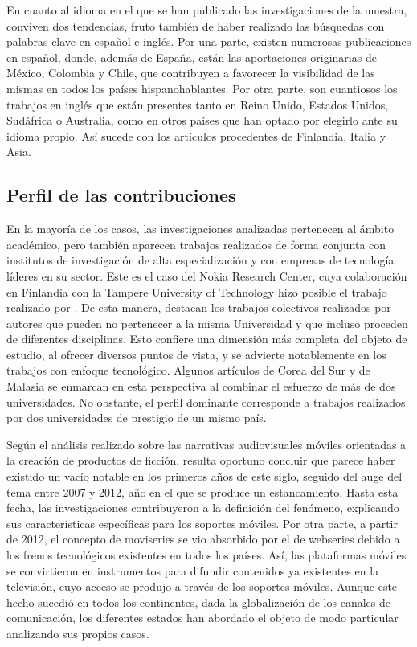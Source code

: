 \documentclass[spanish]{textolivre}
\begin{document}
En cuanto al idioma en el que se han publicado las investigaciones de la muestra, conviven dos tendencias, fruto también de haber realizado las búsquedas con palabras clave en español e inglés. Por una parte, existen numerosas publicaciones en español, donde, además de España, están las aportaciones originarias de México, Colombia y Chile, que contribuyen a favorecer la visibilidad de las mismas en todos los países hispanohablantes. Por otra parte, son cuantiosos los trabajos en inglés que están presentes tanto en Reino Unido, Estados Unidos, Sudáfrica o Australia, como en otros países que han optado por elegirlo ante su idioma propio. Así sucede con los artículos procedentes de Finlandia, Italia y Asia. 

\subsection{Perfil de las contribuciones}
En la mayoría de los casos, las investigaciones analizadas pertenecen al ámbito académico, pero también aparecen trabajos realizados de forma conjunta con institutos de investigación de alta especialización y con empresas de tecnología líderes en su sector. Este es el caso del Nokia Research Center, cuya colaboración en Finlandia con la Tampere University of Technology hizo posible el trabajo realizado por \textcite{jumiskopyykko2008}. De esta manera, destacan los trabajos colectivos realizados por autores que pueden no pertenecer a la misma Universidad y que incluso proceden de diferentes disciplinas. Esto confiere una dimensión más completa del objeto de estudio, al ofrecer diversos puntos de vista, y se advierte notablemente en los trabajos con enfoque tecnológico. Algunos artículos de Corea del Sur \cite{do2009} y de Malasia \cite{wong2016} se enmarcan en esta perspectiva al combinar el esfuerzo de más de dos universidades. No obstante, el perfil dominante corresponde a trabajos realizados por dos universidades de prestigio de un mismo país. 

Según el análisis realizado sobre las narrativas audiovisuales móviles orientadas a la creación de productos de ficción, resulta oportuno concluir que parece haber existido un vacío notable en los primeros años de este siglo, seguido del auge del tema entre 2007 y 2012, año en el que se produce un estancamiento. Hasta esta fecha, las investigaciones contribuyeron a la definición del fenómeno, explicando sus características específicas para los soportes móviles. Por otra parte, a partir de 2012, el concepto de moviseries se vio absorbido por el de webseries debido a los frenos tecnológicos existentes en todos los países. Así, las plataformas móviles se convirtieron en instrumentos para difundir contenidos ya existentes en la televisión, cuyo acceso se produjo a través de los soportes móviles. Aunque este hecho sucedió en todos los continentes, dada la globalización de los canales de comunicación, los diferentes estados han abordado el objeto de modo particular analizando sus propios casos.
\end{document}
